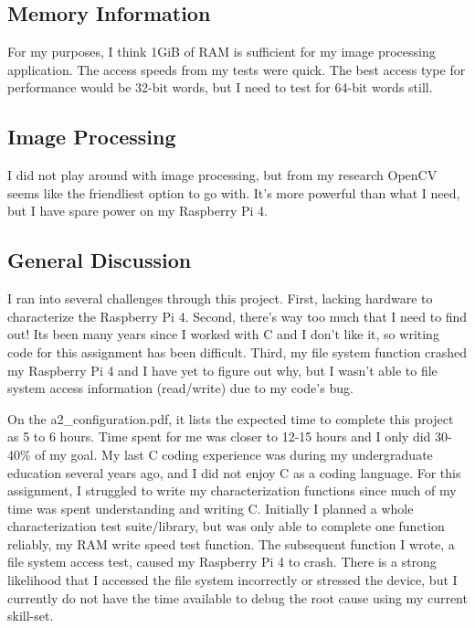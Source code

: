 \documentclass[journal]{IEEEtran}
\begin{document}
    \subsection{Memory Information}
    For my purposes, I think 1GiB of RAM is sufficient for my image processing application. 
    The access speeds from my tests were quick.
    The best access type for performance would be 32-bit words, but I need to test for 64-bit words still.

    \subsection{Image Processing}
    I did not play around with image processing, but from my research OpenCV seems like the friendliest option to go with.
    It's more powerful than what I need, but I have spare power on my Raspberry Pi 4.

    \subsection{General Discussion}

    I ran into several challenges through this project. 
    First, lacking hardware to characterize the Raspberry Pi 4. 
    Second, there's way too much that I need to find out! 
    Its been many years since I worked with C and I don't like it, so writing code for this assignment has been difficult.
    Third, my file system function crashed my Raspberry Pi 4 and I have yet to figure out why, but I wasn't able to file system access information (read/write) due to my code's bug.

    On the a2\_configuration.pdf, it lists the expected time to complete this project as 5 to 6 hours.
    Time spent for me was closer to 12-15 hours and I only did 30-40\% of my goal.
    My last C coding experience was during my undergraduate education several years ago, and I did not enjoy C as a coding language.
    For this assignment, I struggled to write my characterization functions since much of my time was spent understanding and writing C.
    Initially I planned a whole characterization test suite/library, but was only able to complete one function reliably, my RAM write speed test function.
    The subsequent function I wrote, a file system access test, caused my Raspberry Pi 4 to crash.
    There is a strong likelihood that I accessed the file system incorrectly or stressed the device, but I currently do not have the time available to debug the root cause using my current skill-set.  
\end{document}
